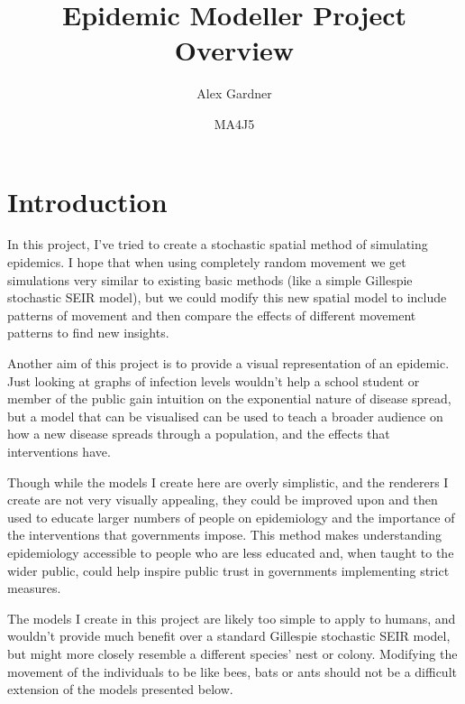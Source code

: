 \documentclass[11pt]{article}
\begin{document}
\title{Epidemic Modeller Project Overview}
\author{Alex Gardner}
\date{MA4J5}
\maketitle

\section*{Introduction}
In this project, I've tried to create a stochastic spatial method of simulating epidemics. I hope that when using completely random movement we get simulations very similar to existing basic methods (like a simple Gillespie stochastic SEIR model), but we could modify this new spatial model to include patterns of movement and then compare the effects of different movement patterns to find new insights.

Another aim of this project is to provide a visual representation of an epidemic. Just looking at graphs of infection levels wouldn't help a school student or member of the public gain intuition on the exponential nature of disease spread, but a model that can be visualised can be used to teach a broader audience on how a new disease spreads through a population, and the effects that interventions have.

Though while the models I create here are overly simplistic, and the renderers I create are not very visually appealing, they could be improved upon and then used to educate larger numbers of people on epidemiology and the importance of the interventions that governments impose. This method makes understanding epidemiology accessible to people who are less educated and, when taught to the wider public, could help inspire public trust in governments implementing strict measures.

The models I create in this project are likely too simple to apply to humans, and wouldn't provide much benefit over a standard Gillespie stochastic SEIR model, but might more closely resemble a different species' nest or colony. Modifying the movement of the individuals to be like bees, bats or ants should not be a difficult extension of the models presented below.
\end{document}
